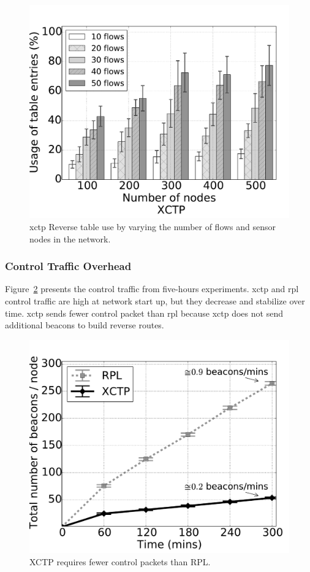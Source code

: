 \begin{figure}[t]
\centerline{
    \includegraphics[width=0.55\linewidth]{img/memory-xctp-bar}
} \caption{\ac{xctp} Reverse table use by varying the number of flows and sensor nodes in the network.} \label{fig:memory-xctp-bar}
\end{figure}




\subsubsection{Control Traffic Overhead}
Figure~\ref{fig:beacons-xctp-vs-rpl} presents the control traffic from five-hours experiments. \ac{xctp} and \ac{rpl} control traffic are high at network start up, but they decrease and stabilize over time. \ac{xctp} sends fewer control packet than \ac{rpl} because \ac{xctp} does not send additional beacons to build reverse routes.

\begin{figure}[ht]
\centerline{
    \includegraphics[width=0.55\linewidth]{img/beacons-xctp-vs-rpl}
} \caption{XCTP requires fewer control packets than RPL.}
\label{fig:beacons-xctp-vs-rpl}
\end{figure}

